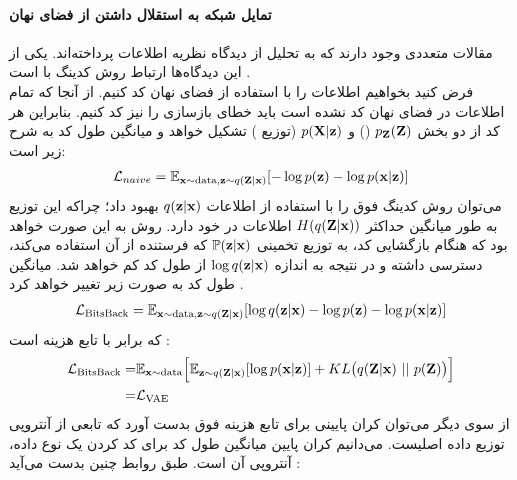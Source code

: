 \paragraph*{تمایل شبکه \decoder{}
	به استقلال داشتن از فضای نهان}
مقالات متعددی وجود دارند که به تحلیل \vae{} از دیدگاه نظریه اطلاعات پرداخته‌اند. یکی از این دیدگاه‌ها ارتباط روش کدینگ \bitsback{} با \vae{} است \cite{vae_lossy}.\\
فرض کنید بخواهیم اطلاعات را با استفاده از فضای نهان \vae{} کد کنیم. از آنجا که تمام اطلاعات در فضای نهان کد نشده است باید خطای بازسازی را نیز کد کنیم. بنابراین هر کد از دو بخش
$p_{\bf Z}({\bf Z})$
(\priordist{})
و $p({\bf X}|{\bf z})$
(توزیع \decoder{})
تشکیل خواهد و میانگین طول کد به شرح زیر است:
\begin{gather}
	\mathcal{L}_{naive} = \mathbb E_{{\bf x} \sim \text{data}, {\bf z} \sim q({\bf Z}|{\bf x})} [-\log p({\bf z}) - \log p({\bf x}|{\bf z})]
\end{gather}
می‌توان روش کدینگ فوق را با استفاده از اطلاعات $q({\bf z}|{\bf x})$ بهبود داد؛ چراکه این توزیع به طور میانگین حداکثر $H(q({\bf Z}|{\bf x}))$ اطلاعات در خود دارد. روش به این صورت خواهد بود که \decoder{} هنگام بازگشایی کد، به توزیع تخمینی $\mathbb P({\bf z}|{\bf x})$ که فرستنده از آن استفاده می‌کند، دسترسی داشته و در نتیجه به اندازه $\log q({\bf z}|{\bf x})$ از طول کد کم خواهد شد. میانگین طول کد به صورت زیر تغییر خواهد کرد \cite{vae_lossy}.
\begin{gather}
	\mathcal{L}_{\text{BitsBack}} = \mathbb E_{{\bf x} \sim \text{data}, {\bf z} \sim q({\bf Z}|{\bf x})} [\log q({\bf z}|{\bf x}) -\log p({\bf z}) - \log p({\bf x}|{\bf z})]
\end{gather}
که برابر با تابع هزینه \vae{} است \cite{vae_lossy}:
\begin{gather}
	\begin{align}
		\mathcal{L}_{\text{BitsBack}} = & \mathbb E_{{\bf x} \sim \text{data}} \Big[\mathbb E_{{\bf z} \sim q({\bf Z}|{\bf x})} [\log p({\bf x}|{\bf z})] + KL\big(q({\bf Z}|{\bf x}) ~||~ p({\bf Z})\big)\Big] \nonumber
		\\
		=                               & \mathcal{L}_{\text{VAE}}
	\end{align}
\end{gather}
از سوی دیگر می‌توان کران پایینی برای تابع هزینه فوق بدست آورد که تابعی از آنتروپی توزیع داده اصلیست. می‌دانیم کران پایین میانگین طول کد برای کد کردن یک نوع داده، آنتروپی آن است. طبق روابط چنین بدست می‌آید \cite{vae_lossy}:
